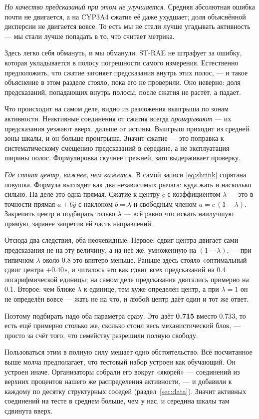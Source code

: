 \emph{Но качество предсказаний при этом не улучшается.} Средняя абсолютная ошибка почти не
двигается, а на CYP3A4 сжатие её даже ухудшает; доля объяснённой дисперсии не двигается
вовсе. То есть мы не стали лучше угадывать активность --- мы стали лучше попадать в то, что
считает метрика.

Здесь легко себя обмануть, и мы обманули. ST-RAE не штрафует за ошибку, которая укладывается
в полосу погрешности самого измерения. Естественно предположить, что сжатие загоняет
предсказания внутрь этих полос, --- и такое объяснение в этом разделе стояло, пока его не
проверили. Оно неверно: доля предсказаний, попадающих внутрь полосы, после сжатия не растёт,
а падает.

Что происходит на самом деле, видно из разложения выигрыша по зонам активности. Неактивные
соединения от сжатия всегда \emph{проигрывают} --- их предсказания уезжают вверх, дальше от
истины. Выигрыш приходит из средней зоны шкалы, и он больше проигрыша. Значит сжатие --- это
поправка к систематическому смещению предсказаний в середине, а не эксплуатация ширины
полос. Формулировка скучнее прежней, зато выдерживает проверку.

\emph{Где стоит центр, важнее, чем кажется.} В самой записи \eqref{eq:shrink} спрятана
ловушка. Формула выглядит как два независимых рычага: куда жать и насколько сильно. На деле
это одна прямая. Сжатие к центру $c$ с коэффициентом $\lambda$ --- это в точности прямая
$a + b\hat y$ с наклоном $b = \lambda$ и свободным членом $a = c\,(1 - \lambda)$. Закрепить
центр и подбирать только $\lambda$ --- всё равно что искать наилучшую прямую, заранее
запретив ей часть направлений.

Отсюда два следствия, оба неочевидные. Первое: сдвиг центра двигает сами предсказания не на
эту величину, а на неё же, умноженную на $(1 - \lambda)$, --- при типичном $\lambda$ около
$0.8$ это впятеро меньше. Раньше здесь стояло «оптимальный сдвиг центра $+0.40$», и читалось
это как сдвиг всех предсказаний на 0.4 логарифмической единицы; на самом деле предсказания
двигались примерно на 0.1. Второе: чем ближе $\lambda$ к единице, тем хуже определён центр, а
при $\lambda = 1$ он не определён вовсе --- жать не на что, и любой центр даёт один и тот же
ответ.

Поэтому подбирать надо оба параметра сразу. Это даёт \textbf{0.715} вместо 0.733, то есть
ещё примерно столько же, сколько стоил весь механистический блок, --- просто за счёт того,
что семейству разрешили полную свободу.

Пользоваться этим в полную силу мешает одно обстоятельство. Всё посчитанное выше молча
предполагает, что тестовый набор устроен как обучающий. Он устроен
иначе. Организаторы собрали его вокруг «якорей» --- соединений из верхних процентов нашего
же распределения активности, --- и добавили к каждому по десятку структурных соседей
(раздел~\ref{sec:data}). Значит активных соединений на тесте в среднем больше, чем у нас, и
середина шкалы там сдвинута вверх.

